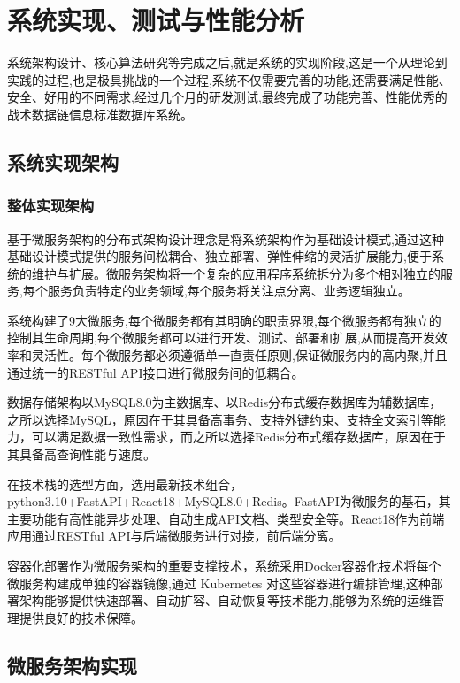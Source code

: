 \chapter{系统实现、测试与性能分析}

系统架构设计、核心算法研究等完成之后,就是系统的实现阶段,这是一个从理论到实践的过程,也是极具挑战的一个过程,系统不仅需要完善的功能,还需要满足性能、安全、好用的不同需求,经过几个月的研发测试,最终完成了功能完善、性能优秀的战术数据链信息标准数据库系统。

\section{系统实现架构}

\subsection{整体实现架构}

基于微服务架构的分布式架构设计理念是将系统架构作为基础设计模式,通过这种基础设计模式提供的服务间松耦合、独立部署、弹性伸缩的灵活扩展能力,便于系统的维护与扩展。微服务架构将一个复杂的应用程序系统拆分为多个相对独立的服务,每个服务负责特定的业务领域,每个服务将关注点分离、业务逻辑独立。

系统构建了9大微服务,每个微服务都有其明确的职责界限,每个微服务都有独立的控制其生命周期,每个微服务都可以进行开发、测试、部署和扩展,从而提高开发效率和灵活性。每个微服务都必须遵循单一直责任原则,保证微服务内的高内聚,并且通过统一的RESTful API接口进行微服务间的低耦合。

数据存储架构以MySQL8.0为主数据库、以Redis分布式缓存数据库为辅数据库，之所以选择MySQL，原因在于其具备高事务、支持外键约束、支持全文索引等能力，可以满足数据一致性需求，而之所以选择Redis分布式缓存数据库，原因在于其具备高查询性能与速度。

在技术栈的选型方面，选用最新技术组合，python3.10+FastAPI+React18+MySQL8.0+Redis。FastAPI为微服务的基石，其主要功能有高性能异步处理、自动生成API文档、类型安全等。React18作为前端应用通过RESTful API与后端微服务进行对接，前后端分离。

容器化部署作为微服务架构的重要支撑技术，系统采用Docker容器化技术将每个微服务构建成单独的容器镜像,通过 Kubernetes 对这些容器进行编排管理,这种部署架构能够提供快速部署、自动扩容、自动恢复等技术能力,能够为系统的运维管理提供良好的技术保障。

\section{微服务架构实现}

